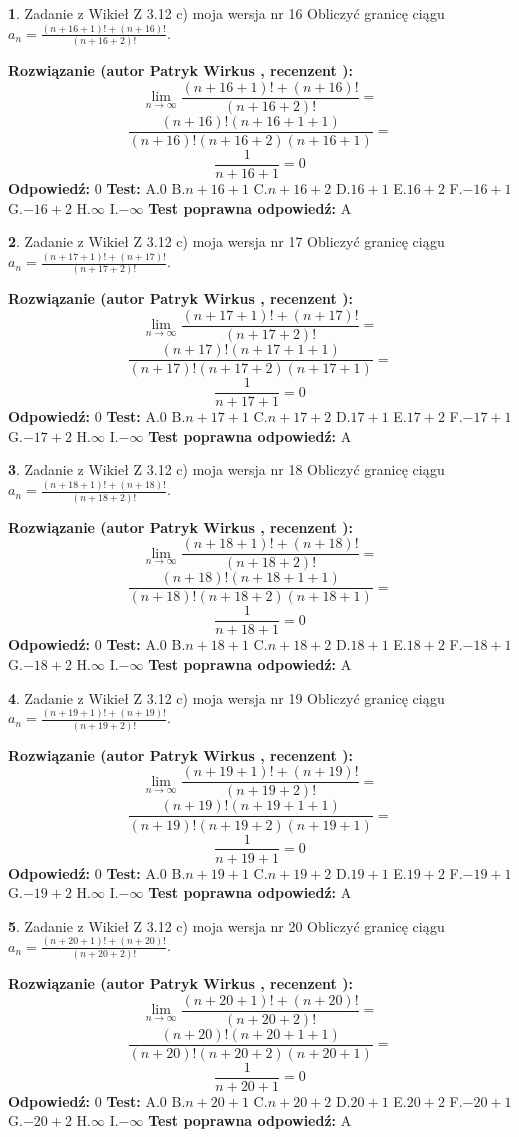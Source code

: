 \documentclass[12pt, a4paper]{article}
\theoremstyle{definition} %
\newtheorem{zad}{}
\newcommand{\zadStart}[1]{\begin{zad}#1\newline}
\newcommand{\zadStop}{\end{zad}}
\newcommand{\rozwStart}[2]{\noindent \textbf{Rozwiązanie (autor #1 , recenzent #2): }\newline}
\newcommand{\rozwStop}{\newline}
\newcommand{\odpStart}{\noindent \textbf{Odpowiedź:}\newline}
\newcommand{\odpStop}{\newline}
\newcommand{\testStart}{\noindent \textbf{Test:}\newline}
\newcommand{\testStop}{\newline}
\newcommand{\kluczStart}{\noindent \textbf{Test poprawna odpowiedź:}\newline}
\newcommand{\kluczStop}{\newline}
\begin{document}
\zadStart{Zadanie z Wikieł Z 3.12 c) moja wersja nr 16}
Obliczyć granicę ciągu $a_{n}=\frac{(n+16+1)!+(n+16)!}{(n+16+2)!}$.
\zadStop
\rozwStart{Patryk Wirkus}{}
$$\lim\limits_{n\to\infty}\frac{(n+16+1)!+(n+16)!}{(n+16+2)!}=$$
$$\frac{(n+16)!(n+16+1+1)}{(n+16)!(n+16+2)(n+16+1)}=$$
$$\frac{1}{n+16+1}= 0$$
\rozwStop
\odpStart
$0$
\odpStop
\testStart
A.$0$
B.$n+16+1$
C.$n+16+2$
D.$16+1$
E.$16+2$
F.$-16+1$
G.$-16+2$
H.$\infty$
I.$-\infty$
\testStop
\kluczStart
A
\kluczStop



\zadStart{Zadanie z Wikieł Z 3.12 c) moja wersja nr 17}
Obliczyć granicę ciągu $a_{n}=\frac{(n+17+1)!+(n+17)!}{(n+17+2)!}$.
\zadStop
\rozwStart{Patryk Wirkus}{}
$$\lim\limits_{n\to\infty}\frac{(n+17+1)!+(n+17)!}{(n+17+2)!}=$$
$$\frac{(n+17)!(n+17+1+1)}{(n+17)!(n+17+2)(n+17+1)}=$$
$$\frac{1}{n+17+1}= 0$$
\rozwStop
\odpStart
$0$
\odpStop
\testStart
A.$0$
B.$n+17+1$
C.$n+17+2$
D.$17+1$
E.$17+2$
F.$-17+1$
G.$-17+2$
H.$\infty$
I.$-\infty$
\testStop
\kluczStart
A
\kluczStop



\zadStart{Zadanie z Wikieł Z 3.12 c) moja wersja nr 18}
Obliczyć granicę ciągu $a_{n}=\frac{(n+18+1)!+(n+18)!}{(n+18+2)!}$.
\zadStop
\rozwStart{Patryk Wirkus}{}
$$\lim\limits_{n\to\infty}\frac{(n+18+1)!+(n+18)!}{(n+18+2)!}=$$
$$\frac{(n+18)!(n+18+1+1)}{(n+18)!(n+18+2)(n+18+1)}=$$
$$\frac{1}{n+18+1}= 0$$
\rozwStop
\odpStart
$0$
\odpStop
\testStart
A.$0$
B.$n+18+1$
C.$n+18+2$
D.$18+1$
E.$18+2$
F.$-18+1$
G.$-18+2$
H.$\infty$
I.$-\infty$
\testStop
\kluczStart
A
\kluczStop



\zadStart{Zadanie z Wikieł Z 3.12 c) moja wersja nr 19}
Obliczyć granicę ciągu $a_{n}=\frac{(n+19+1)!+(n+19)!}{(n+19+2)!}$.
\zadStop
\rozwStart{Patryk Wirkus}{}
$$\lim\limits_{n\to\infty}\frac{(n+19+1)!+(n+19)!}{(n+19+2)!}=$$
$$\frac{(n+19)!(n+19+1+1)}{(n+19)!(n+19+2)(n+19+1)}=$$
$$\frac{1}{n+19+1}= 0$$
\rozwStop
\odpStart
$0$
\odpStop
\testStart
A.$0$
B.$n+19+1$
C.$n+19+2$
D.$19+1$
E.$19+2$
F.$-19+1$
G.$-19+2$
H.$\infty$
I.$-\infty$
\testStop
\kluczStart
A
\kluczStop



\zadStart{Zadanie z Wikieł Z 3.12 c) moja wersja nr 20}
Obliczyć granicę ciągu $a_{n}=\frac{(n+20+1)!+(n+20)!}{(n+20+2)!}$.
\zadStop
\rozwStart{Patryk Wirkus}{}
$$\lim\limits_{n\to\infty}\frac{(n+20+1)!+(n+20)!}{(n+20+2)!}=$$
$$\frac{(n+20)!(n+20+1+1)}{(n+20)!(n+20+2)(n+20+1)}=$$
$$\frac{1}{n+20+1}= 0$$
\rozwStop
\odpStart
$0$
\odpStop
\testStart
A.$0$
B.$n+20+1$
C.$n+20+2$
D.$20+1$
E.$20+2$
F.$-20+1$
G.$-20+2$
H.$\infty$
I.$-\infty$
\testStop
\kluczStart
A
\kluczStop
\end{document}
